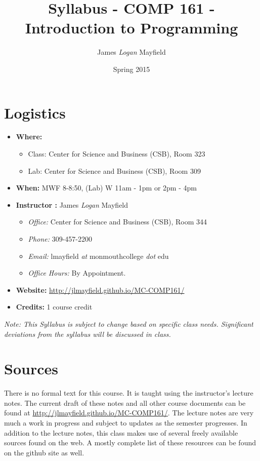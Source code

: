 \documentclass[10pt]{article}
\title{Syllabus - COMP 161 - Introduction to Programming}
\author{ James \textit{Logan} Mayfield }
\date{Spring 2015}
\begin{document}
\maketitle

\section{Logistics}
\begin{itemize}
\item \textbf{Where: } 
\begin{itemize} 
\item Class: Center for Science and Business (CSB), Room 323	
\item Lab: Center for Science and Business (CSB), Room 309
\end{itemize}
\item \textbf{When: } MWF 8-8:50, (Lab) W 11am - 1pm or 2pm - 4pm
\item \textbf{Instructor :} James \textit{Logan} Mayfield
\begin{itemize}
\item \textit{Office: } Center for Science and Business (CSB), Room 344
\item \textit{Phone: } 309-457-2200
\item \textit{Email: } lmayfield \textit{at} monmouthcollege \textit{dot} edu
\item \textit{Office Hours: }  By Appointment.
\end{itemize}
\item \textbf{Website: } \url{http://jlmayfield.github.io/MC-COMP161/}
\item \textbf{Credits: } 1 course credit
\end{itemize}
\emph{Note: This Syllabus is subject to change based on specific class needs. Significant deviations from the syllabus will be discussed in class.}

\section{Sources}

There is no formal text for this course. It is taught using the instructor's lecture notes. The current draft of these notes and all other course documents can be found at \url{http://jlmayfield.github.io/MC-COMP161/}. The lecture notes are very much a work in progress and subject to updates as the semester progresses. 
In addition to the lecture notes, this class makes use of several freely available sources found on the web. A mostly complete list of these resources can be found on the github site as well.  
\end{document}
